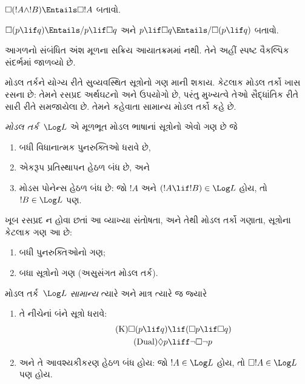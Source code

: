 \begin{prob}
  $\Box (!A \land !B) \Entails \Box !A$ બતાવો.
\end{prob}

\begin{prob}
  $\Box (p \lif q) \Entails/ p \lif \Box q$ અને $p \lif \Box
  q \Entails/\Box (p \lif q)$ બતાવો.
\end{prob}
\endgroup


\OLEndChapterHook


\begin{editorial}
આગળનો સંબંધિત અંશ મૂળના સક્રિય આયાતક્રમમાં નથી. તેને અહીં સ્પષ્ટ વૈકલ્પિક સંદર્ભમાં જાળવ્યો છે.
\end{editorial}
\begingroup
\makeatletter{}\makeatother


\label{guunit:OLP-0654}


મોડલ તર્કને યોગ્ય રીતે સુવ્યવસ્થિત
સૂત્રોનો ગણ માની શકાય.
કેટલાક મોડલ તર્કો ખાસ રસના
છે: તેમને રસપ્રદ અર્થઘટનો અને
ઉપયોગો છે, પરંતુ મુખ્યત્વે તેઓ
સૈદ્ધાંતિક રીતે સારી રીતે
સમજાયેલા છે. તેમને કહેવાતા
સામાન્ય મોડલ તર્કો કહે છે.

\begin{defn}
\emph{મોડલ તર્ક}~$\Log L$
એ મૂળભૂત મોડલ ભાષાનાં
સૂત્રોનો એવો ગણ છે જે
\begin{enumerate}
\item બધી વિધાનાત્મક પુનરુક્તિઓ
  ધરાવે છે,
\item એકરૂપ પ્રતિસ્થાપન હેઠળ
  બંધ છે, અને
\item મોડસ પોનેન્સ હેઠળ બંધ છે:
  જો $!A$ અને $(!A \lif
  !B) \in \Log L$ હોય,
  તો $!B \in \Log L$ પણ.
\end{enumerate}
\end{defn}

\begin{ex}
ખૂબ રસપ્રદ ન હોવા છતાં
આ વ્યાખ્યા સંતોષતા,
અને તેથી મોડલ તર્કો
ગણાતા, સૂત્રોના
કેટલાક ગણ આ છે:
\begin{enumerate}
\item બધી પુનરુક્તિઓનો ગણ;
\item બધા સૂત્રોનો ગણ
  (અસુસંગત મોડલ તર્ક).
\end{enumerate}
\end{ex}

\begin{defn}\label{defn:normal-modal-logic}
મોડલ તર્ક~$\Log L$
\emph{સામાન્ય} ત્યારે અને
માત્ર ત્યારે જ જ્યારે
\begin{enumerate}
\item તે નીચેનાં બંને
  સૂત્રો ધરાવે:
\begin{align}
\tag{K} \Box(p \lif q) & \lif (\Box p \lif \Box q) \\
\tag{Dual} \Diamond p & \liff \lnot \Box \lnot p
\end{align}
\item અને તે આવશ્યકીકરણ
  હેઠળ બંધ હોય: જો
  $!A \in
  \Log L$ હોય,
  તો $\Box !A \in \Log L$
  પણ હોય.
\end{enumerate}
\end{defn}

